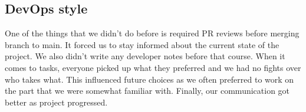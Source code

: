 \documentclass{article}
\begin{document}
\subsection{DevOps style}
One of the things that we didn't do before is required PR reviews before merging branch to main. It forced us to stay informed about the current state of the project. We also didn't write any developer notes before that course. When it comes to tasks, everyone picked up what they preferred and we had no fights over who takes what. This influenced future choices as we often preferred to work on the part that we were somewhat familiar with. Finally, our communication got better as project progressed.
\end{document}
